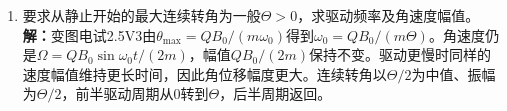 \documentclass[UTF8,fontset=fandol,a4paper,11pt]{ctexart}
\begin{document}
\begin{enumerate}
\item 要求从静止开始的最大连续转角为一般$\Theta>0$，求驱动频率及角速度幅值。
\textbf{解：}变图电试2.5V3由$\theta_{\max}=QB_0/(m\omega_0)$得到$\omega_0=QB_0/(m\Theta)$。角速度仍是$\Omega=QB_0\sin\omega_0t/(2m)$，幅值$QB_0/(2m)$保持不变。驱动更慢时同样的速度幅值维持更长时间，因此角位移幅度更大。连续转角以$\Theta/2$为中值、振幅为$\Theta/2$，前半驱动周期从0转到$\Theta$，后半周期返回。
\begin{center}\begin{minipage}{.98\linewidth}\centering
{}
\end{minipage}
\end{center}
\end{enumerate}
\end{document}
